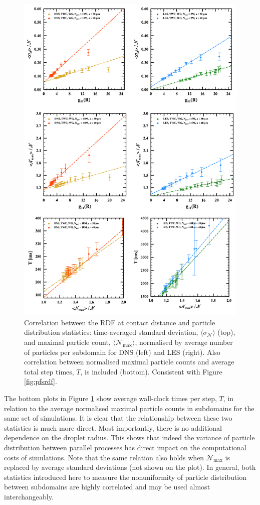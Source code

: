 \documentclass{pracamgren}
\begin{document}
\begin{figure}[!htbp]
\centering
\includegraphics[width=13.5cm]{figures/3-15_pfprdf.pdf}
\caption{
Correlation between the RDF at contact distance and particle distribution statistics: time-averaged standard deviation, $\langle \sigma_{\mathcal{N}} \rangle$ (top), and maximal particle count, $\langle \mathcal{N}_{\max} \rangle$, normalised by average number of particles per subdomain for DNS (left) and LES (right).
Also correlation between normalised maximal particle counts and average total step times, $T$, is included (bottom).
Consistent with Figure \ref{fig:pfsrdf}.
}
\label{fig:pfprdf}
\end{figure}

The bottom plots in Figure \ref{fig:pfprdf} show average wall-clock times per step, $T$, in relation to the average normalised maximal particle counts in subdomains for the same set of simulations.
It is clear that the relationship between these two statistics is much more direct.
Most importantly, there is no additional dependence on the droplet radius.
This shows that indeed the variance of particle distribution between parallel processes has direct impact on the computational costs of simulations.
Note that the same relation also holds when $\mathcal{N}_{\max}$ is replaced by average standard deviations (not shown on the plot).
In general, both statistics introduced here to measure the nonuniformity of particle distribution between subdomains are highly correlated and may be used almost interchangeably.
\end{document}
